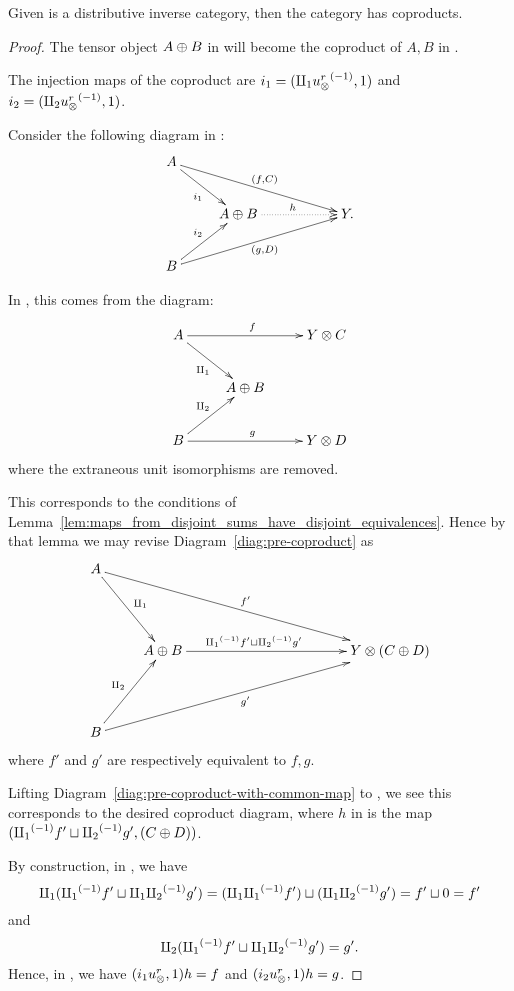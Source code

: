 \begin{proposition}\label{thm:x_tilde_has_coproducts_if_x_is_inverse_distributive_category}
  Given \X is a distributive inverse category, then the category \Xt has coproducts.
\end{proposition}
\begin{proof}
  The tensor object $A\oplus B$ in \X will become the coproduct of $A, B$ in \Xt.

  The injection maps of the coproduct are $i_1 =(\amalg_{1} {u_{\otimes}^r}^{(-1)}, 1)$ and
  $i_2 = (\amalg_{2} {u_{\otimes}^r}^{(-1)}, 1)$.

  Consider the following diagram in \Xt:
  \[
    \xymatrix{
      A \ar[drrr]^{(f,C)} \ar[dr]_{i_1} \\
      & A\+B \ar@{.>}[rr]^h & & Y. \\
      B \ar[urrr]_{(g,D)} \ar[ur]^{i_2}
    }
  \]

  In \X, this comes from the diagram:
  \begin{equation}
    \xymatrix{
      A \ar[dr]_{\cpa} \ar[rr]^f && Y\*C\\
      & A\+B\\
      B \ar[ur]^{\cpb} \ar[rr]^g && Y\*D\\
    }\label{diag:pre-coproduct}
  \end{equation}
  where the extraneous unit isomorphisms are removed.

  This corresponds to the conditions of
  Lemma~\ref{lem:maps_from_disjoint_sums_have_disjoint_equivalences}. Hence by that lemma we may
  revise Diagram~\ref{diag:pre-coproduct} as
  \begin{equation}
    \xymatrix@R+20pt {
      A \ar[dr]^{\cpa} \ar[drrrrr]^{f'}\\
      &A\+B \ar[rrrr]^(.4){\icpa f' \djoin \icpb g'} &&&& Y\*(C\+D)\\
      B \ar[ur]^{\cpb} \ar[urrrrr]_{g'}\\
    }\label{diag:pre-coproduct-with-common-map}
  \end{equation}
  where $f'$ and $g'$ are respectively equivalent to $f,g$.

  Lifting Diagram~\ref{diag:pre-coproduct-with-common-map} to \X, we see this corresponds to the
  desired coproduct diagram, where  $h$ in \Xt is the map $({\amalg_{1}}^{(-1)} f' \sqcup {\amalg_{2}}^{(-1)} g', (C\oplus D))$.

  By construction, in \X, we have
  \[
    \amalg_{1} ({\amalg_{1}}^{(-1)} f' \sqcup \amalg_{1}{\amalg_{2}}^{(-1)} g') = (\amalg_{1}{\amalg_{1}}^{(-1)} f') \sqcup (\amalg_{1}{\amalg_{2}}^{(-1)} g') = f' \sqcup 0 = f'
  \]
  and
  \[
    \amalg_{2} ({\amalg_{1}}^{(-1)} f' \sqcup \amalg_{1}{\amalg_{2}}^{(-1)} g') = g'.
  \]
  Hence, in \Xt, we have  $(i_1 u_{\otimes}^r, 1) h = f$ and $(i_2 u_{\otimes}^r, 1) h = g$.


\end{proof}
